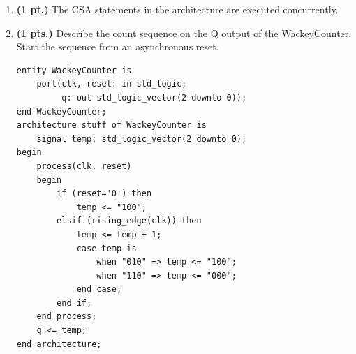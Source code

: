 \documentclass{article}
\begin{document}
\begin{enumerate}
\pagebreak


\item{\bf (1 pt.)}  The CSA statements in the architecture are executed 
concurrently.

\item {\bf (1 pts.)}  Describe the count sequence on the Q output
of the WackeyCounter.  Start the sequence from an asynchronous reset.

\begin{verbatim}
entity WackeyCounter is
    port(clk, reset: in std_logic;
         q: out std_logic_vector(2 downto 0));
end WackeyCounter;
architecture stuff of WackeyCounter is
    signal temp: std_logic_vector(2 downto 0);
begin
    process(clk, reset)
    begin
        if (reset='0') then
            temp <= "100";
        elsif (rising_edge(clk)) then
            temp <= temp + 1;
            case temp is
                when "010" => temp <= "100";
                when "110" => temp <= "000";
            end case;
        end if;
    end process;
    q <= temp;
end architecture;
\end{verbatim}



\pagebreak

\end{enumerate}
\end{document}
